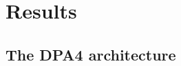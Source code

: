 \documentclass[fleqn,12pt]{wlscirep}
\begin{document}



\section{Results}
\label{sec:results}


\subsection{The DPA4 architecture}
\label{sec:arch_overview}
\end{document}
